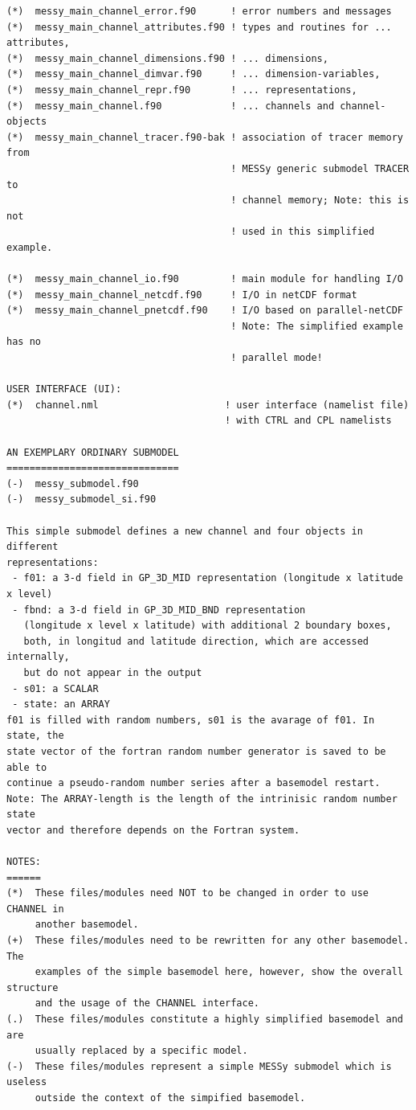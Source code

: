\documentclass[twoside]{article}
\begin{document}
\begin{verbatim}
(*)  messy_main_channel_error.f90      ! error numbers and messages
(*)  messy_main_channel_attributes.f90 ! types and routines for ... attributes,
(*)  messy_main_channel_dimensions.f90 ! ... dimensions,
(*)  messy_main_channel_dimvar.f90     ! ... dimension-variables,
(*)  messy_main_channel_repr.f90       ! ... representations,
(*)  messy_main_channel.f90            ! ... channels and channel-objects
(*)  messy_main_channel_tracer.f90-bak ! association of tracer memory from
                                       ! MESSy generic submodel TRACER to
                                       ! channel memory; Note: this is not
                                       ! used in this simplified example.

(*)  messy_main_channel_io.f90         ! main module for handling I/O
(*)  messy_main_channel_netcdf.f90     ! I/O in netCDF format
(*)  messy_main_channel_pnetcdf.f90    ! I/O based on parallel-netCDF
                                       ! Note: The simplified example has no
                                       ! parallel mode!

USER INTERFACE (UI):
(*)  channel.nml                      ! user interface (namelist file)
                                      ! with CTRL and CPL namelists

AN EXEMPLARY ORDINARY SUBMODEL
==============================
(-)  messy_submodel.f90
(-)  messy_submodel_si.f90

This simple submodel defines a new channel and four objects in different
representations:
 - f01: a 3-d field in GP_3D_MID representation (longitude x latitude x level)
 - fbnd: a 3-d field in GP_3D_MID_BND representation
   (longitude x level x latitude) with additional 2 boundary boxes,
   both, in longitud and latitude direction, which are accessed internally,
   but do not appear in the output
 - s01: a SCALAR
 - state: an ARRAY
f01 is filled with random numbers, s01 is the avarage of f01. In state, the
state vector of the fortran random number generator is saved to be able to
continue a pseudo-random number series after a basemodel restart.
Note: The ARRAY-length is the length of the intrinisic random number state
vector and therefore depends on the Fortran system.

NOTES:
======
(*)  These files/modules need NOT to be changed in order to use CHANNEL in
     another basemodel.
(+)  These files/modules need to be rewritten for any other basemodel. The
     examples of the simple basemodel here, however, show the overall structure
     and the usage of the CHANNEL interface.
(.)  These files/modules constitute a highly simplified basemodel and are
     usually replaced by a specific model.
(-)  These files/modules represent a simple MESSy submodel which is useless
     outside the context of the simpified basemodel.


\end{verbatim}
\end{document}
